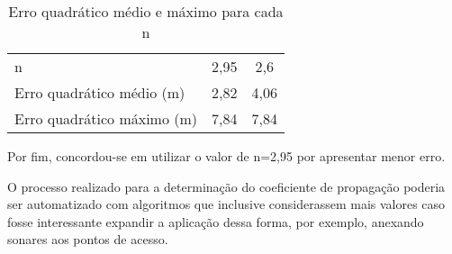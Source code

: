 \begin{table}[ht]
\centering
\caption{Erro quadrático médio e máximo para cada n}
\vspace{0.5cm}
\begin{tabular}{l|cc}
\hline
n & 2,95 & 2,6 \vspace{0.4cm}\\
Erro quadrático médio (m) & 2,82 & 4,06 \vspace{0.4cm}\\
Erro quadrático máximo (m) & 7,84 & 7,84
\end{tabular}
\end{table}

Por fim, concordou-se em utilizar o valor de n=2,95 por apresentar menor erro.

O processo realizado para a determinação do coeficiente de propagação poderia ser automatizado com algoritmos que inclusive considerassem mais valores caso fosse interessante expandir a aplicação dessa forma, por exemplo, anexando sonares aos pontos de acesso.
